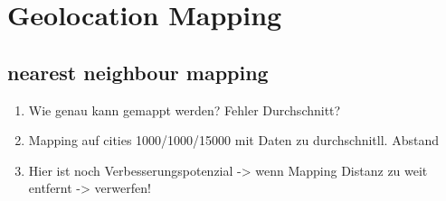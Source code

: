 \section{Geolocation Mapping}

	\subsection{nearest neighbour mapping}
		\begin{enumerate}
			\item {} Wie genau kann gemappt werden? Fehler Durchschnitt?
			\item Mapping auf cities 1000/1000/15000 mit Daten zu durchschnitll. Abstand
			\item Hier ist noch Verbesserungspotenzial -> wenn Mapping Distanz zu weit entfernt -> verwerfen!
		\end{enumerate} 



\section{}